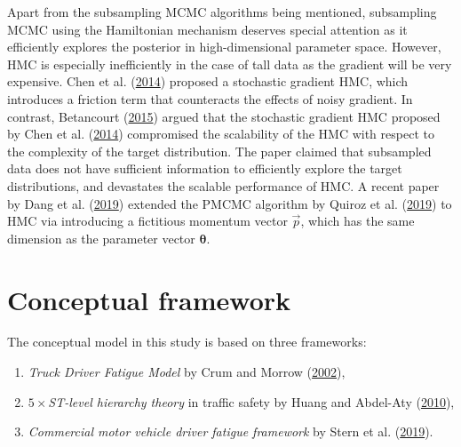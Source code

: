 \documentclass[12pt]{book}
\numberwithin{equation}{chapter}
\providecommand{\tightlist}{%
  \setlength{\itemsep}{0pt}\setlength{\parskip}{0pt}}
\begin{document}
Apart from the subsampling MCMC algorithms being mentioned, subsampling MCMC using the Hamiltonian mechanism deserves special attention as it efficiently explores the posterior in high-dimensional parameter space. However, HMC is especially inefficiently in the case of tall data as the gradient will be very expensive. Chen et al. (\protect\hyperlink{ref-chen2014stochastic}{2014}) proposed a stochastic gradient HMC, which introduces a friction term that counteracts the effects of noisy gradient. In contrast, Betancourt (\protect\hyperlink{ref-betancourt2015fundamental}{2015}) argued that the stochastic gradient HMC proposed by Chen et al. (\protect\hyperlink{ref-chen2014stochastic}{2014}) compromised the scalability of the HMC with respect to the complexity of the target distribution. The paper claimed that subsampled data does not have sufficient information to efficiently explore the target distributions, and devastates the scalable performance of HMC. A recent paper by Dang et al. (\protect\hyperlink{ref-dang2019hamiltonian}{2019}) extended the PMCMC algorithm by Quiroz et al. (\protect\hyperlink{ref-quiroz2019speeding}{2019}) to HMC via introducing a fictitious momentum vector \(\vec{p}\), which has the same dimension as the parameter vector \(\mathbf{\theta}\).

\hypertarget{conceptual-framework}{%
\section{Conceptual framework}\label{conceptual-framework}}

The conceptual model in this study is based on three frameworks:

\begin{enumerate}
\def\labelenumi{\arabic{enumi}.}
\tightlist
\item
  \emph{Truck Driver Fatigue Model} by Crum and Morrow (\protect\hyperlink{ref-crum2002influence}{2002}),
\item
  \emph{\(5 \times\)ST-level hierarchy theory} in traffic safety by Huang and Abdel-Aty (\protect\hyperlink{ref-huang2010multilevel}{2010}),
\item
  \emph{Commercial motor vehicle driver fatigue framework} by Stern et al. (\protect\hyperlink{ref-stern2019data}{2019}).
\end{enumerate}
\end{document}
